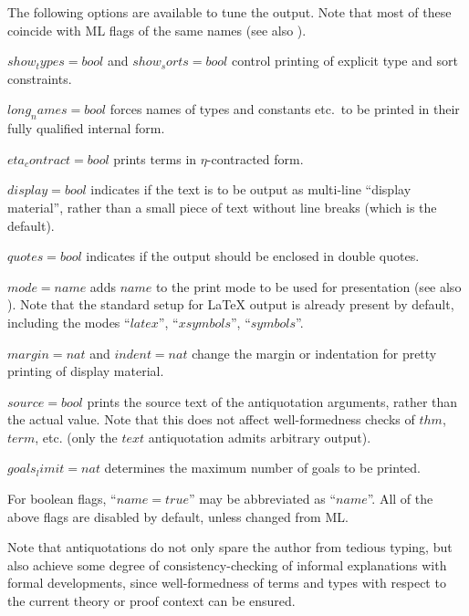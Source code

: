 \medskip

The following options are available to tune the output.  Note that most of
these coincide with ML flags of the same names (see also \cite{isabelle-ref}).
\begin{descr}
\item[$show_types = bool$ and $show_sorts = bool$] control printing of
  explicit type and sort constraints.
\item[$long_names = bool$] forces names of types and constants etc.\ to be
  printed in their fully qualified internal form.
\item[$eta_contract = bool$] prints terms in $\eta$-contracted form.
\item[$display = bool$] indicates if the text is to be output as multi-line
  ``display material'', rather than a small piece of text without line breaks
  (which is the default).
\item[$quotes = bool$] indicates if the output should be enclosed in double
  quotes.
\item[$mode = name$] adds $name$ to the print mode to be used for presentation
  (see also \cite{isabelle-ref}).  Note that the standard setup for {\LaTeX}
  output is already present by default, including the modes ``$latex$'',
  ``$xsymbols$'', ``$symbols$''.
\item[$margin = nat$ and $indent = nat$] change the margin or indentation for
  pretty printing of display material.
\item[$source = bool$] prints the source text of the antiquotation arguments,
  rather than the actual value.  Note that this does not affect
  well-formedness checks of $thm$, $term$, etc. (only the $text$ antiquotation
  admits arbitrary output).
\item[$goals_limit = nat$] determines the maximum number of goals to be
  printed.
\end{descr}

For boolean flags, ``$name = true$'' may be abbreviated as ``$name$''.  All of
the above flags are disabled by default, unless changed from ML.

\medskip Note that antiquotations do not only spare the author from tedious
typing, but also achieve some degree of consistency-checking of informal
explanations with formal developments, since well-formedness of terms and
types with respect to the current theory or proof context can be ensured.

